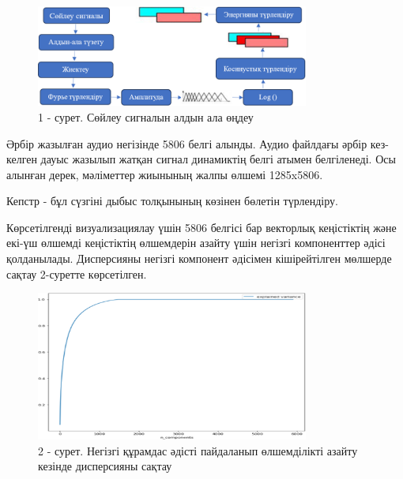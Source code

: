 \begin{figure}[H]
	\centering
	\includegraphics[width=0.8\textwidth]{media/ict/image5}
	\caption*{1 - сурет. Сөйлеу сигналын алдын ала өңдеу}
\end{figure}

\begin{multicols}{2}
Әрбір жазылған аудио негізінде 5806 белгі алынды. Аудио файлдағы әрбір
кез-келген дауыс жазылып жатқан сигнал динамиктің белгі атымен
белгіленеді. Осы алынған дерек, мәліметтер жиынының жалпы өлшемі
1285x5806.

Кепстр - бұл сүзгіні дыбыс толқынының көзінен бөлетін түрлендіру.

Көрсетілгенді визуализациялау үшін 5806 белгісі бар векторлық
кеңістіктің және екі-үш өлшемді кеңістіктің өлшемдерін азайту үшін
негізгі компоненттер әдісі қолданылады. Дисперсияны негізгі компонент
әдісімен кішірейтілген мөлшерде сақтау 2-суретте көрсетілген.
\end{multicols}

\begin{figure}[H]
	\centering
	\includegraphics[width=0.8\textwidth]{media/ict/image6}
	\caption*{2 - сурет. Негізгі құрамдас әдісті пайдаланып өлшемділікті азайту кезінде дисперсияны сақтау}
\end{figure}

